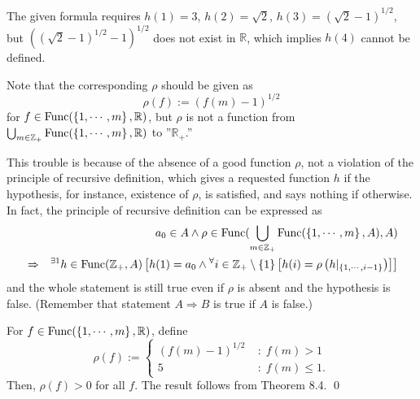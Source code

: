 \documentclass[a4paper,12pt]{article}
\begin{document}
\begin{sol}\leavevmode \par
	The given formula requires
	\( h(1)=3\),
	\( h(2)=\sqrt{2} \),
	\( h(3)=\left( \sqrt{2} - 1 \right)^{1/2} \),
	but
	\( \left( \left( \sqrt{2} - 1 \right)^{1/2} - 1 \right)^{1/2}  \)
	does not exist in \( \mathbb{R} \),
	which implies
	\( h(4) \)
	cannot be defined.
	
	Note that the corresponding \( \rho \) should be given as
	\begin{equation*}
		\rho(f):=\left( f(m)-1 \right)^{1/2}
	\end{equation*}
	for
	\( f \in \mathrm{Func}(\left\{1, \cdots, m \right\},\mathbb{R}) \),
	but
	\( \rho \)
	is not a function from
	\( \bigcup_{m\in \mathbb{Z}_{+}}\mathrm{Func}(\left\{1, \cdots, m \right\},\mathbb{R}) \)
	to
	''\( \mathbb{R}_{+} \).''
	
	This trouble is because of the absence of a good function \( \rho \),
	not a violation of the principle of recursive definition,
	which gives a requested function
	\( h \)
	if the hypothesis, for instance, existence of 
	\( \rho \),
	is satisfied, and says nothing if otherwise.
	In fact, the principle of recursive definition can be expressed as
	\begin{eqnarray*}
		&&a_0\in A
		\wedge
		\rho \in \mathrm{Func}(\bigcup_{m\in \mathbb{Z}_{+}}\mathrm{Func}(\left\{1, \cdots, m \right\},A),A)\\
		&\Rightarrow&
		{}^{\exists 1} h \in \mathrm{Func}(\mathbb{Z}_{+},A)
		\left[
			h(1)=a_0
			\wedge
			{}^{\forall}  i \in \mathbb{Z}_{+} \setminus \left\{ 1 \right\}
			\left[
				h(i) = \rho \left( h|_{\left\{ 1,\cdots,i-1 \right\}} \right)
				\right]
			\right]
	\end{eqnarray*}
	and the whole statement is still true even if \( \rho \) is absent and the hypothesis is false.
	(Remember that statement \( A \Rightarrow B \) is true if \( A \) is false.)
	
	For
	\( f \in \mathrm{Func}(\left\{1, \cdots, m \right\},\mathbb{R}) \),
	define
	\begin{equation*}
		\rho(f):=\begin{cases}
			\left( f(m) - 1 \right)^{1/2} & \;\mathrm{:}\; f(m)>1     \\
			5                             & \;\mathrm{:}\; f(m)\le 1.
		\end{cases}
	\end{equation*}
	Then,
	\( \rho(f)>0 \)
	for all
	\( f \).
	The result follows from Theorem 8.4.
	\qed\end{sol}
\end{document}

